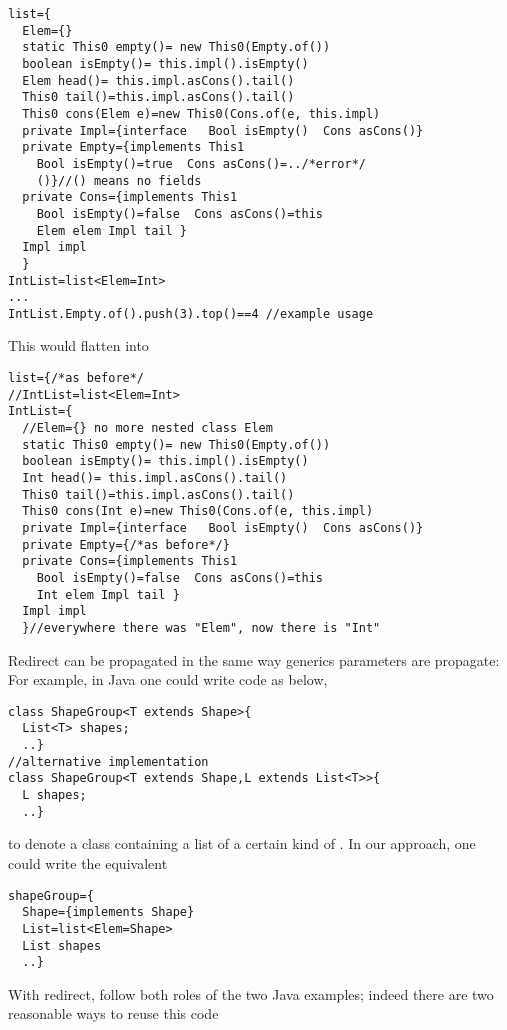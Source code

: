 \begin{lstlisting}
list={
  Elem={}
  static This0 empty()= new This0(Empty.of())
  boolean isEmpty()= this.impl().isEmpty()
  Elem head()= this.impl.asCons().tail()
  This0 tail()=this.impl.asCons().tail()
  This0 cons(Elem e)=new This0(Cons.of(e, this.impl)
  private Impl={interface   Bool isEmpty()  Cons asCons()}
  private Empty={implements This1
    Bool isEmpty()=true  Cons asCons()=../*error*/
    ()}//() means no fields
  private Cons={implements This1
    Bool isEmpty()=false  Cons asCons()=this
    Elem elem Impl tail }
  Impl impl
  }
IntList=list<Elem=Int>
...
IntList.Empty.of().push(3).top()==4 //example usage
\end{lstlisting}
This would flatten into
\begin{lstlisting}
list={/*as before*/
//IntList=list<Elem=Int>
IntList={
  //Elem={} no more nested class Elem
  static This0 empty()= new This0(Empty.of())
  boolean isEmpty()= this.impl().isEmpty()
  Int head()= this.impl.asCons().tail()
  This0 tail()=this.impl.asCons().tail()
  This0 cons(Int e)=new This0(Cons.of(e, this.impl)
  private Impl={interface   Bool isEmpty()  Cons asCons()}
  private Empty={/*as before*/}
  private Cons={implements This1
    Bool isEmpty()=false  Cons asCons()=this
    Int elem Impl tail }
  Impl impl
  }//everywhere there was "Elem", now there is "Int"
\end{lstlisting}

Redirect can be propagated in the same way generics parameters are propagate:
For example, in Java one could write code as below,
\begin{lstlisting}
class ShapeGroup<T extends Shape>{
  List<T> shapes;
  ..}
//alternative implementation
class ShapeGroup<T extends Shape,L extends List<T>>{
  L shapes;
  ..}
\end{lstlisting}
to denote a class containing a list of a certain kind of \Q@Shape@s.
In our approach, one could write the equivalent
\begin{lstlisting}
shapeGroup={
  Shape={implements Shape}
  List=list<Elem=Shape>
  List shapes
  ..}
\end{lstlisting}
With redirect, \Q@shapeGroup@ follow both roles of the two Java examples;
indeed there are two reasonable ways to reuse this code

